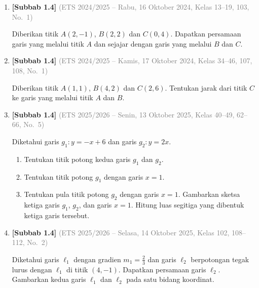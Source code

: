 \documentclass[10pt,openany,a4paper]{article}
\theoremstyle{definition}
\theoremstyle{definition}
\theoremstyle{plain}
\begin{document}
\begin{enumerate}
    \item \textbf{[Subbab 1.4]} {\footnotesize\textcolor{gray}{(ETS 2024/2025 -- Rabu, 16 Oktober 2024, Kelas 13--19, 103, No.~1)}}\par
    Diberikan titik $A(2,-1)$, $B(2,2)$ dan $C(0,4)$. Dapatkan persamaan garis yang melalui titik $A$ dan sejajar dengan garis yang melalui $B$ dan $C$.

    \item \textbf{[Subbab 1.4]} {\footnotesize\textcolor{gray}{(ETS 2024/2025 -- Kamis, 17 Oktober 2024, Kelas 34--46, 107, 108, No.~1)}}\par
    Diberikan titik $A(1,1)$, $B(4,2)$ dan $C(2,6)$. Tentukan jarak dari titik $C$ ke garis yang melalui titik $A$ dan $B$.

    \item \textbf{[Subbab 1.4]} {\footnotesize\textcolor{gray}{(ETS 2025/2026 -- Senin, 13 Oktober 2025, Kelas 40--49, 62--66, No.~5)}}\par
    Diketahui garis $g_1: y = -x + 6$ dan garis $g_2: y = 2x$.
    \begin{enumerate}
        \item Tentukan titik potong kedua garis $g_1$ dan $g_2$.
        \item Tentukan titik potong $g_1$ dengan garis $x = 1$.
        \item Tentukan pula titik potong $g_2$ dengan garis $x = 1$. Gambarkan sketsa ketiga garis $g_1$, $g_2$, dan garis $x = 1$. Hitung luas segitiga yang dibentuk ketiga garis tersebut.
    \end{enumerate}

    \item \textbf{[Subbab 1.4]} {\footnotesize\textcolor{gray}{(ETS 2025/2026 -- Selasa, 14 Oktober 2025, Kelas 102, 108--112, No.~2)}}\par
    Diketahui garis $\ell_1$ dengan gradien $m_1=\frac{2}{3}$ dan garis $\ell_2$ berpotongan tegak lurus dengan $\ell_1$ di titik $(4,-1)$. Dapatkan persamaan garis $\ell_2$. \\
    Gambarkan kedua garis $\ell_1$ dan $\ell_2$ pada satu bidang koordinat.

\end{enumerate}
\end{document}
